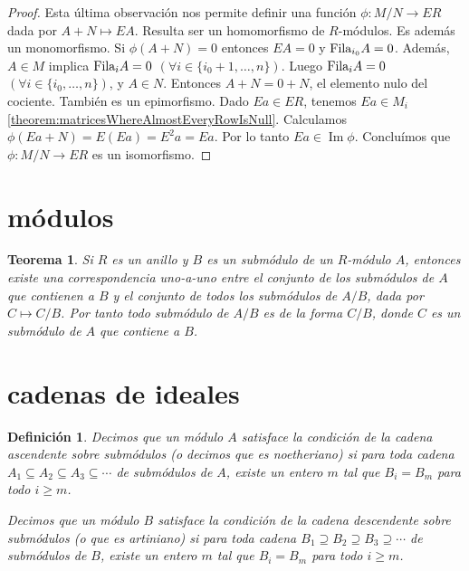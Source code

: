 \documentclass{report}
\newcommand{\Fila}{\textnormal{Fila}}
\DeclareMathOperator{\image}{\text{Im}}
\newtheorem{theorem}{Teorema}
\newtheorem{definition}{Definición}
\begin{document}
\begin{proof}
    Esta última observación nos permite definir una función \(\phi : M / N \rightarrow E R\) dada por \(A + N \mapsto E A\).
    Resulta ser un homomorfismo de \(R\)-módulos.
    Es además un monomorfismo.
    Si \(\phi(A + N) = 0\) entonces \(E A = 0\) y \(\Fila_{i_0} A = 0\).
    Además, \(A \in M\) implica \(\Fila_i A = 0\) \((\forall i \in \{i_0 + 1, \dots, n\})\).
    Luego \(\Fila_i A = 0\) \((\forall i \in \{i_0, \dots, n\})\), y \(A \in N\).
    Entonces \(A + N = 0 + N\), el elemento nulo del cociente.
    También es un epimorfismo.
    Dado \(E a \in E R\), tenemos \(E a \in M_i\) \ref{theorem:matricesWhereAlmostEveryRowIsNull}.
    Calculamos \(\phi(E a + N) = E (E a) = E^2 a = E a\).
    Por lo tanto \(E a \in \image \phi\).
    Concluímos que \(\phi : M / N \rightarrow E R\) es un isomorfismo.
  \end{proof}

  \section{módulos}
  \begin{theorem}
    \label{theorem:submodulesOfQuotientModule}
    Si \(R\) es un anillo y \(B\) es un submódulo de un \(R\)-módulo \(A\), entonces existe una correspondencia uno-a-uno entre el conjunto de los submódulos de \(A\) que contienen a \(B\) y el conjunto de todos los submódulos de \(A / B\), dada por \(C \mapsto C / B\).
    Por tanto todo submódulo de \(A / B\) es de la forma \(C / B\), donde \(C\) es un submódulo de \(A\) que contiene a \(B\).
  \end{theorem}


  \section{cadenas de ideales}

  \begin{definition}
    Decimos que un módulo \(A\) satisface la \emph{condición de la cadena ascendente sobre submódulos} (o decimos que es \emph{noetheriano}) si para toda cadena \(A_1 \subseteq A_2 \subseteq A_3 \subseteq \cdots\) de submódulos de \(A\), existe un entero \(m\) tal que \(B_i = B_m\) para todo \(i \geq m\).

    Decimos que un módulo \(B\) satisface la \emph{condición de la cadena descendente sobre submódulos} (o que es \emph{artiniano}) si para toda cadena \(B_1 \supseteq B_2 \supseteq B_3 \supseteq \cdots\) de submódulos de \(B\), existe un entero \(m\) tal que \(B_i = B_m\) para todo \(i \geq m\).
  \end{definition}
\end{document}
